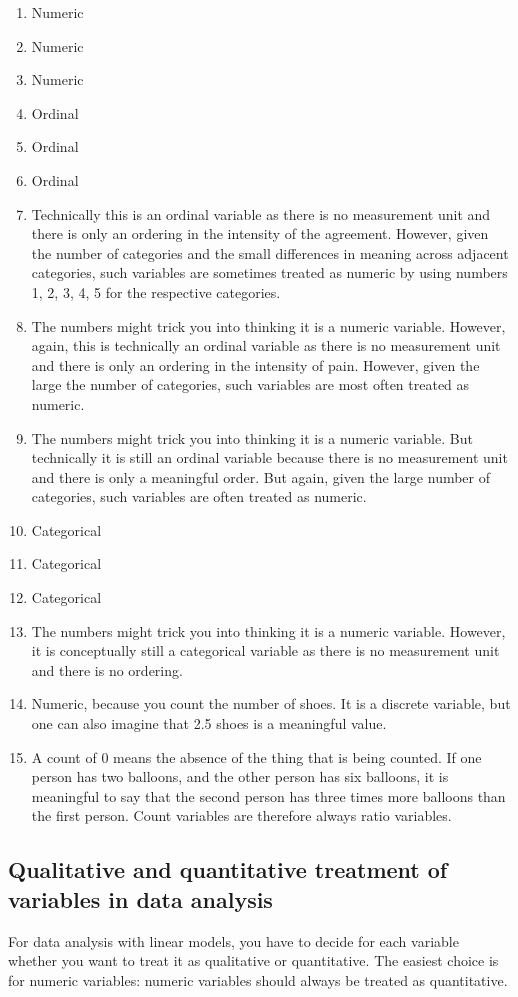 \documentclass[]{report}\usepackage[]{graphicx}\usepackage[]{color}
\begin{document}
\begin{enumerate}
\item Numeric
\item Numeric
\item Numeric
\item Ordinal
\item Ordinal
\item Ordinal
\item Technically this is an ordinal variable as there is no measurement unit and there is only an ordering in the intensity of the agreement. However, given the number of categories and the small differences in meaning across adjacent categories, such variables are sometimes treated as numeric by using numbers 1, 2, 3, 4, 5 for the respective categories.
\item The numbers might trick you into thinking it is a numeric variable. However, again, this is technically an ordinal variable as there is no measurement unit and there is only an ordering in the intensity of pain. However, given the large the number of categories, such variables are most often treated as numeric.
\item The numbers might trick you into thinking it is a numeric variable. But technically it is still an ordinal variable because there is no measurement unit and there is only a meaningful order. But again, given the large number of categories, such variables are often treated as numeric.
\item Categorical
\item Categorical
\item Categorical
\item The numbers might trick you into thinking it is a numeric variable. However, it is conceptually still a categorical variable as there is no measurement unit and there is no ordering. 
\item Numeric, because you count the number of shoes. It is a discrete variable, but one can also imagine that 2.5 shoes is a meaningful value.
\item A count of 0 means the absence of the thing that is being counted. If one person has two balloons, and the other person has six balloons, it is meaningful to say that the second person has three times more balloons than the first person. Count variables are therefore always ratio variables.
\end{enumerate}



\subsection{Qualitative and quantitative treatment of variables in data analysis}
For data analysis with linear models, you have to decide for each variable whether you want to treat it as qualitative or quantitative. The easiest choice is for numeric variables: numeric variables should always be treated as quantitative. 
\end{document}
